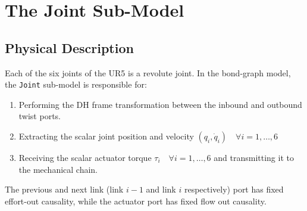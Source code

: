 \chapter{The Joint Sub-Model}
\label{chap:joint}

\section{Physical Description}

Each of the six joints of the UR5 is a revolute joint.
In the bond-graph model, the \texttt{Joint} sub-model is responsible for:
\begin{enumerate}
  \item Performing the DH frame transformation between the inbound and outbound twist ports.
  \item Extracting the scalar joint position and velocity $(q_i, \dot{q}_i) \quad \forall i = 1, \dots, 6$
  \item Receiving the scalar actuator torque $\tau_i \quad \forall i = 1, \dots, 6$ and transmitting it to the mechanical chain.
\end{enumerate}

The previous and next link (link $i-1$ and link $i$ respectively) port has fixed effort-out causality, while the actuator port has fixed flow out causality. 

